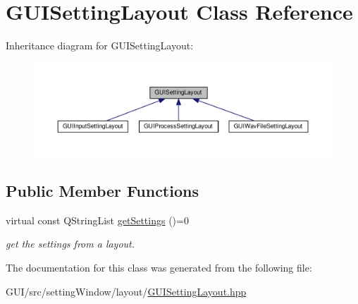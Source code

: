 \hypertarget{class_g_u_i_setting_layout}{}\section{G\+U\+I\+Setting\+Layout Class Reference}
\label{class_g_u_i_setting_layout}


Inheritance diagram for G\+U\+I\+Setting\+Layout\+:
\nopagebreak
\begin{figure}[H]
\begin{center}
\leavevmode
\includegraphics[width=350pt]{class_g_u_i_setting_layout__inherit__graph}
\end{center}
\end{figure}
\subsection*{Public Member Functions}
\begin{DoxyCompactItemize}
\item 
\mbox{\label{class_g_u_i_setting_layout_aa1d7031225076febae3c7779fc82eeaa}} 
virtual const Q\+String\+List \mbox{\hyperlink{class_g_u_i_setting_layout_aa1d7031225076febae3c7779fc82eeaa}{get\+Settings}} ()=0
\begin{DoxyCompactList}\small\item\em get the settings from a layout. \end{DoxyCompactList}\end{DoxyCompactItemize}


The documentation for this class was generated from the following file\+:\begin{DoxyCompactItemize}
\item 
G\+U\+I/src/setting\+Window/layout/\mbox{\hyperlink{_g_u_i_setting_layout_8hpp}{G\+U\+I\+Setting\+Layout.\+hpp}}\end{DoxyCompactItemize}
